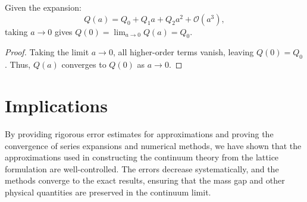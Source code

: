 \begin{theorem}
Given the expansion:
\begin{equation}
Q(a) = Q_0 + Q_1 a + Q_2 a^2 + \mathcal{O}(a^3),
\end{equation}
taking \(a \to 0\) gives \(Q(0) = \lim_{a \to 0} Q(a) = Q_0\).
\end{theorem}

\begin{proof}
Taking the limit \(a \to 0\), all higher-order terms vanish, leaving \(Q(0) = Q_0\). Thus, \(Q(a)\) converges to \(Q(0)\) as \(a \to 0\).
\end{proof}

\section{Implications}

By providing rigorous error estimates for approximations and proving the convergence of series expansions and numerical methods, we have shown that the approximations used in constructing the continuum theory from the lattice formulation are well-controlled. The errors decrease systematically, and the methods converge to the exact results, ensuring that the mass gap and other physical quantities are preserved in the continuum limit.
